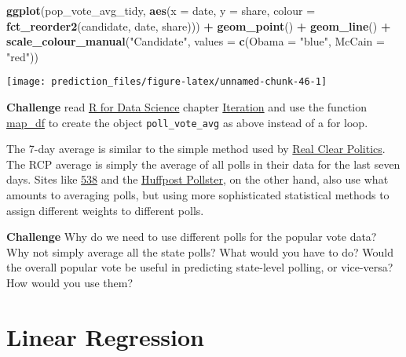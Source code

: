 \documentclass[]{book}
\newenvironment{Shaded}{\begin{snugshade}}{\end{snugshade}}
\newcommand{\DataTypeTok}[1]{\textcolor[rgb]{0.13,0.29,0.53}{#1}}
\newcommand{\KeywordTok}[1]{\textcolor[rgb]{0.13,0.29,0.53}{\textbf{#1}}}
\newcommand{\NormalTok}[1]{#1}
\newcommand{\OperatorTok}[1]{\textcolor[rgb]{0.81,0.36,0.00}{\textbf{#1}}}
\newcommand{\StringTok}[1]{\textcolor[rgb]{0.31,0.60,0.02}{#1}}
\theoremstyle{definition}
\theoremstyle{definition}
\theoremstyle{definition}
\theoremstyle{remark}
\begin{document}
\begin{Shaded}
\begin{Highlighting}[]
\KeywordTok{ggplot}\NormalTok{(pop_vote_avg_tidy, }\KeywordTok{aes}\NormalTok{(}\DataTypeTok{x =}\NormalTok{ date, }\DataTypeTok{y =}\NormalTok{ share,}
                              \DataTypeTok{colour =} \KeywordTok{fct_reorder2}\NormalTok{(candidate, date, share))) }\OperatorTok{+}
\StringTok{  }\KeywordTok{geom_point}\NormalTok{() }\OperatorTok{+}
\StringTok{  }\KeywordTok{geom_line}\NormalTok{() }\OperatorTok{+}
\StringTok{  }\KeywordTok{scale_colour_manual}\NormalTok{(}\StringTok{"Candidate"}\NormalTok{,}
                      \DataTypeTok{values =} \KeywordTok{c}\NormalTok{(}\DataTypeTok{Obama =} \StringTok{"blue"}\NormalTok{, }\DataTypeTok{McCain =} \StringTok{"red"}\NormalTok{))}
\end{Highlighting}
\end{Shaded}

\begin{center}\texttt{[image: prediction\_files/figure-latex/unnamed-chunk-46-1]} \end{center}

\textbf{Challenge} read \href{http://r4ds.had.co.nz/}{R for Data
Science} chapter
\href{http://r4ds.had.co.nz/iteration.html\#the-map-functions}{Iteration}
and use the function
\href{https://www.rdocumentation.org/packages/purrr/topics/map_df}{map\_df}
to create the object \texttt{poll\_vote\_avg} as above instead of a for
loop.

The 7-day average is similar to the simple method used by
\href{http://www.realclearpolitics.com/epolls/2016/president/us/general_election_trump_vs_clinton-5491.html}{Real
Clear Politics}. The RCP average is simply the average of all polls in
their data for the last seven days. Sites like
\href{https://fivethirtyeight.com}{538} and the
\href{http://elections.huffingtonpost.com/pollster}{Huffpost Pollster},
on the other hand, also use what amounts to averaging polls, but using
more sophisticated statistical methods to assign different weights to
different polls.

\textbf{Challenge} Why do we need to use different polls for the popular
vote data? Why not simply average all the state polls? What would you
have to do? Would the overall popular vote be useful in predicting
state-level polling, or vice-versa? How would you use them?

\hypertarget{linear-regression}{%
\section{Linear Regression}\label{linear-regression}}
\end{document}
